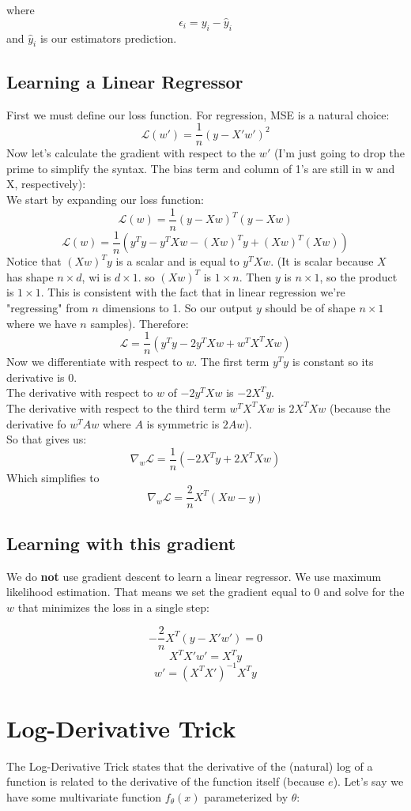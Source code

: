 \documentclass[12pt]{article}
\begin{document}
where 
\[\epsilon_i = y_i - \hat{y}_i\]
and \( \hat{y}_i\) is our estimators prediction.
\subsection{Learning a Linear Regressor}
First we must define our loss function. For regression, MSE is a natural choice:
\[\mathcal{L}(w') = \frac{1}{n}(y - X'w')^2\]
Now let's calculate the gradient with respect to the \(w'\) (I'm just going to drop the prime to simplify the syntax. The bias term and column of 1's are still in w and X, respectively):\\

We start by expanding our loss function:
\[
\mathcal{L}(w) = \frac{1}{n} (y - Xw)^T (y - Xw)
\]
\[
\mathcal{L}(w)  = \frac{1}{n} \left( y^T y - y^T Xw - (Xw)^T y + (Xw)^T (Xw) \right)
\]
Notice that \( (Xw)^T y \) is a scalar and is equal to \( y^T Xw \). (It is scalar because \(X\) has shape \(n \times d\), wi is \(d \times 1\). so \((Xw)^T\) is \(1 \times n\). Then \(y\) is \(n\times 1\), so the product is \(1\times 1\). This is consistent with the fact that in linear regression we're "regressing" from \(n\) dimensions to 1. So our output \(y\) should be of shape \(n \times 1\) where we have \(n\) samples). Therefore:
\[
\mathcal{L} = \frac{1}{n} \left( y^T y - 2 y^T Xw + w^T X^T X w \right)
\]
Now we differentiate with respect to \(w\). The first term \( y^T y \) is constant so its derivative is 0.\\
The derivative with respect to \(w\) of \(- 2 y^T Xw\) is \(-2X^Ty\).\\
The derivative with respect to the third term \(w^T X^T X w\) is \(2X^TXw\) (because the derivative fo \(w^TAw\) where \(A\) is symmetric is \(2Aw\)).\\
So that gives us:
\[\nabla_w\mathcal{L} = \frac{1}{n}(-2X^Ty + 2X^TXw)\]
Which simplifies to
\[
\nabla_w\mathcal{L} = \frac{2}{n} X^T (Xw - y)
\]

\subsection{Learning with this gradient}
We do \textbf{not} use gradient descent to learn a linear regressor. We use maximum likelihood estimation. That means we set the gradient equal to 0 and solve for the \( w \) that minimizes the loss in a single step:

\[
-\frac{2}{n} X^T (y - X'w') = 0
\]
\[
X^T X' w' = X^T y
\]
\[
w' = (X^T X')^{-1} X^T y
\]
\section{Log-Derivative Trick}
The Log-Derivative Trick states that the derivative of the (natural) log of a function is related to the derivative of the function itself (because \( e \)). Let's say we have some multivariate function \( f_{\theta}(x) \) parameterized by \( \theta \):
\end{document}
